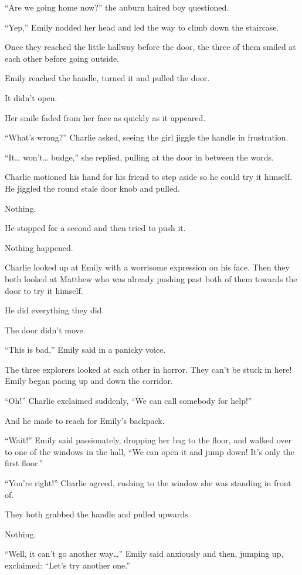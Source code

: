 “Are we going home now?” the auburn haired boy questioned.

“Yep,” Emily nodded her head and led the way to climb down the staircase.

Once they reached the little hallway before the door, the three of them smiled at each other before going outside.

Emily reached the handle, turned it and pulled the door.

It didn't open.

Her smile faded from her face as quickly as it appeared.

“What's wrong?” Charlie asked, seeing the girl jiggle the handle in frustration.

“It… won't… budge,” she replied, pulling at the door in between the words.

Charlie motioned his hand for his friend to step aside so he could try it himself. He jiggled the round stale door knob and pulled.

Nothing.

He stopped for a second and then tried to push it.

Nothing happened.

Charlie looked up at Emily with a worrisome expression on his face. Then they both looked at Matthew who was already pushing past both of them towards the door to try it himself.

He did everything they did.

The door didn't move.

“This is bad,” Emily said in a panicky voice.

The three explorers looked at each other in horror. They can't be stuck in here! Emily began pacing up and down the corridor.

“Oh!” Charlie exclaimed suddenly, “We can call somebody for help!”

And he made to reach for Emily's backpack.

“Wait!” Emily said passionately, dropping her bag to the floor, and walked over to one of the windows in the hall, “We can open it and jump down! It's only the first floor.”

“You're right!” Charlie agreed, rushing to the window she was standing in front of.

They both grabbed the handle and pulled upwards.

Nothing.

“Well, it can't go another way…” Emily said anxiously and then, jumping up, exclaimed: “Let's try another one.”

